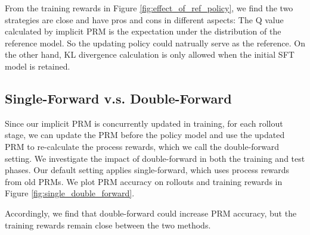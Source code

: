 From the training rewards in Figure \ref{fig:effect_of_ref_policy}, we find the two strategies are close and have pros and cons in different aspects: The Q value calculated by implicit PRM is the expectation under the distribution of the reference model. So the updating policy could natrually serve as the reference.
On the other hand, KL divergence calculation is only allowed when the initial SFT model is retained.




\subsection{Single-Forward v.s. Double-Forward}
Since our implicit PRM is concurrently updated in training, for each rollout stage, we can update the PRM before the policy model and use the updated PRM to re-calculate the process rewards, which we call the double-forward setting. We investigate the impact of double-forward in both the training and test phases. Our default setting applies single-forward, which uses process rewards from old PRMs. We plot PRM accuracy on rollouts and training rewards in Figure \ref{fig:single_double_forward}.


% 
Accordingly, we find that double-forward could increase PRM accuracy, but the training rewards remain close between the two methods. %


\begin{table}
\centering
\caption{The comparison of resource requirements between Eurus-2-7B-PRIME and Qwen2.5-Math-7B-Instruct.}
\label{tab:comparision}
\end{table}

